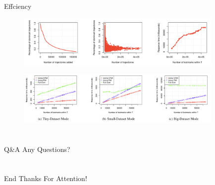 \documentclass[mathserif]{beamer}
\begin{document}
\begin{frame}{Effciency}
\begin{figure}
\includegraphics[width = 10cm]{exp5.png}
\end{figure}
\begin{figure}
\includegraphics[width = 10cm]{exp6.png}
\end{figure}
\end{frame}

\AtBeginSection{}

\section[Q\&{}A]{}
\begin{frame}{Q\&{}A}
  \color{blue}\huge{Any Questions?}
\end{frame}

\section[End]{}
\begin{frame}{End}
  \color{blue}\huge{Thanks For Attention!}
\end{frame}
\end{document}
